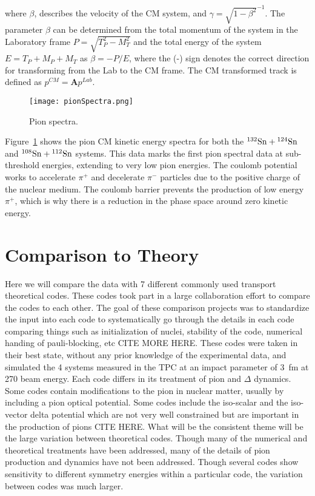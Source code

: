 where $\beta$, describes the velocity of the CM system, and $\gamma=\sqrt{1-\beta^2}^{-1}$. The parameter $\beta$ can be determined from the total momentum of the system in the Laboratory frame $P = \sqrt{ T_{P}^2 - M_{T}^2}$ and the total energy of the system $E = T_{P} + M_{P} + M_{T}$ as $\beta = -P/E$, where the (-) sign denotes the correct direction for transforming from the Lab to the CM frame. The CM transformed track is defined as $p^{CM} = \textbf{A}p^{Lab}$.

\begin{figure}[!htb]
\centering
\texttt{[image: pionSpectra.png]}
\caption{Pion spectra. }
\label{fig:pionspectra}
\end{figure}


Figure~\ref{fig:pionspectra} shows the pion CM kinetic energy spectra for both the ${}^{132}\mathrm{Sn} + {}^{124}\mathrm{Sn}$ and ${}^{108}\mathrm{Sn} + {}^{112}\mathrm{Sn}$ systems. This data marks the first pion spectral data at sub-threshold energies, extending to very low pion energies. The coulomb potential works to accelerate $\pi^+$ and decelerate $\pi^-$ particles due to the positive charge of the nuclear medium. The coulomb barrier prevents the production of low energy $\pi^+$, which is why there is a reduction in the phase space around zero kinetic energy. 






\section{Comparison to Theory}

Here we will compare the data with 7 different commonly used transport theoretical codes. These codes took part in a large collaboration effort to compare the codes to each other. The goal of these comparison projects was to standardize the input into each code to systematically go through the details in each code comparing things such as initialization of nuclei, stability of the code, numerical handing of pauli-blocking, etc \cite{theoryComp1,theoryComp2} CITE MORE HERE. These codes were taken in their best state, without any prior knowledge of the experimental data, and simulated the 4 systems measured in the \spirit TPC at an impact parameter of \SI{3}{\femto\metre} at \SI{270}{\MeVA} beam energy. Each code differs in its treatment of pion and $\Delta$ dynamics. Some codes contain modifications to the pion in nuclear matter, usually by including a pion optical potential. Some codes include the iso-scalar and the iso-vector delta potential which are not very well constrained but are important in the production of pions CITE HERE. What will be the consistent theme will be the large variation between theoretical codes. Though many of the numerical and theoretical treatments have been addressed, many of the details of pion production and dynamics have not been addressed. Though several codes show sensitivity to different symmetry energies within a particular code, the variation between codes  was much larger. 


